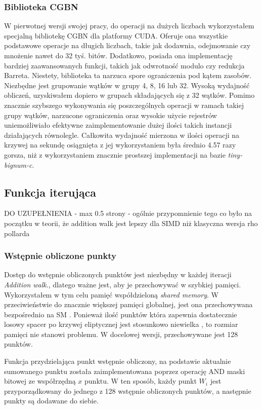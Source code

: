 \subsubsection{Biblioteka CGBN}
W pierwotnej wersji swojej pracy, do operacji na dużych liczbach wykorzystałem specjalną bibliotekę CGBN dla platformy CUDA. Oferuje ona
wszystkie podstawowe operacje na długich liczbach, takie jak dodawnia, odejmowanie czy mnożenie nawet do 32 tyś. bitów.
Dodatkowo, posiada ona implementację bardziej zaawansowanych funkcji, takich jak odwrotność modulo czy redukcja Barreta.
Niestety, biblioteka ta narzuca spore ograniczenia pod kątem zasobów. Niezbędne jest grupowanie wątków w grupy
4, 8, 16 lub 32. Wysoką wydajność obliczeń, uzyskiwałem dopiero w grupach składających się z 32 wątków.
Pomimo znacznie szybszego wykonywania się poszczególnych operacji w ramach takiej grupy wątków, narzucone
ograniczenia oraz wysokie użycie rejestrów uniemożliwiało
efektywne zaimplementowanie dużej ilości takich instancji działających równolegle.
Całkowita wydajność mierzona w ilości operacji na krzywej na sekundę osiągnięta z jej wykorzystaniem była średnio 4.57 razy gorsza, niż
z wykorzystaniem znacznie prostszej implementacji na bazie \textit{tiny-bignum-c}.


\subsection{Funkcja iterująca}
DO UZUPEŁNIENIA - max 0.5 strony - ogólnie przypomnienie tego co było na początku w teorii, że addition walk jest lepszy dla SIMD niż klasyczna wersja rho pollarda


\subsubsection{Wstępnie obliczone punkty}
Dostęp do wstępnie obliczonych punktów jest niezbędny w każdej iteracji \textit{Addition walk}.,
dlatego ważne jest, aby je przechowywać w szybkiej pamięci. Wykorzystałem w tym celu pamięć współdzieloną \textit{shared memory}.
W przeciwieństwie do znacznie większej pamięci globalnej, jest ona przechowywana bezpośrednio na SM \cite{CUDA_BOOK}.
Ponieważ ilość punktów która zapewnia dostatecznie losowy spacer po krzywej eliptycznej jest stosunkowo niewielka \cite{Teske2000},
to rozmiar pamięci nie stanowi problemu. W docelowej wersji, przechowywane jest 128 punktów.
\par
Funkcja przydzielająca punkt wstępnie obliczony, na podstawie aktualnie sumowanego punktu została zaimplementowana
poprzez operację AND maski bitowej ze współrzędną $x$ punktu.
W ten sposób, każdy punkt $W_i$ jest przyporządkowany do jednego z 128 wstępnie obliczonych punktów,
a następnie punkty są dodawane do siebie.


